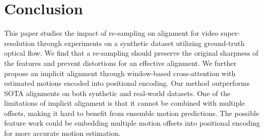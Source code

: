 \documentclass[10pt,twocolumn,letterpaper]{article}
\begin{document}
\vspace{-0.3em}
\section{Conclusion}\label{sec:conclusion}
This paper studies the impact of re-sampling on alignment for video super-resolution through experiments on a synthetic dataset utilizing ground-truth optical flow. We find that a re-sampling should preserve the original sharpness of the features and prevent distortions for an effective alignment. We further propose an implicit alignment through window-based cross-attention with estimated motions encoded into positional encoding. Our method outperforms SOTA alignments on both synthetic and real-world datasets. One of the limitations of implicit alignment is that it cannot be combined with multiple offsets, making it hard to benefit from ensemble motion predictions. The possible feature work could be embedding multiple motion offsets into positional encoding for more accurate motion estimation.

{\small


}
\end{document}
